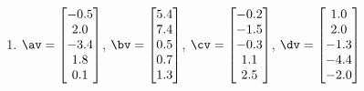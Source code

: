 \begin{exercise}
\begin{enumerate}
\item \(\av=\begin{bmatrix}-0.5\\2.0\\-3.4\\1.8\\0.1\end{bmatrix}\), \(\bv=\begin{bmatrix}5.4\\7.4\\0.5\\0.7\\1.3\end{bmatrix}\), \(\cv=\begin{bmatrix} -0.2\\-1.5\\-0.3\\1.1\\2.5\end{bmatrix}\), \(\dv=\begin{bmatrix}1.0\\2.0\\-1.3\\-4.4\\-2.0\end{bmatrix}\)
\setbox\ajrqrbox\hbox{}%
\marginpar{\usebox{\ajrqrbox\\[2ex]}}%

\end{enumerate}
\end{exercise}





\begin{comment}%
why, what caused X?
how did X occur?
what-if? what-if-not?
how does X compare with Y?
what is the evidence for X?
why is X important?
\end{comment}



